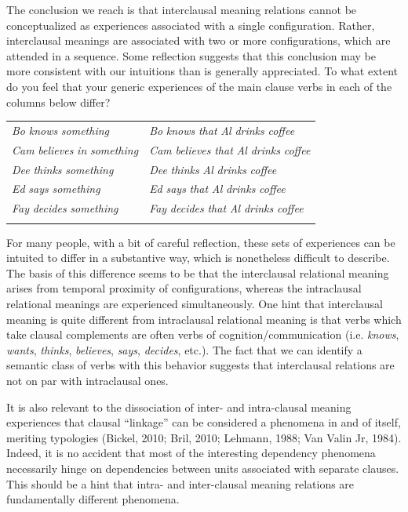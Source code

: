   The conclusion we reach is that interclausal meaning relations cannot be conceptualized as experiences associated with a single configuration. Rather, interclausal meanings are associated with two or more configurations, which are attended in a sequence. Some reflection suggests that this conclusion may be more consistent with our intuitions than is generally appreciated. To what extent do you feel that your generic experiences of the main clause verbs in each of the columns below differ?

\begin{tabularx}{\textwidth}{XX}
\lsptoprule
\textit{Bo} \textit{knows} \textit{something} & \textit{Bo} \textit{knows} \textit{that} \textit{Al} \textit{drinks} \textit{coffee}\\
\textit{Cam} \textit{believes} \textit{in} \textit{something} & \textit{Cam} \textit{believes} \textit{that} \textit{Al} \textit{drinks} \textit{coffee}\\
\textit{Dee} \textit{thinks} \textit{something}  & \textit{Dee} \textit{thinks} \textit{Al} \textit{drinks} \textit{coffee}\\
\textit{Ed} \textit{says} \textit{something} & \textit{Ed} \textit{says} \textit{that} \textit{Al} \textit{drinks} \textit{coffee}\\
\textit{Fay} \textit{decides} \textit{something} & \textit{Fay} \textit{decides} \textit{that} \textit{Al} \textit{drinks} \textit{coffee}\\
\lspbottomrule
\end{tabularx}
  For many people, with a bit of careful reflection, these sets of experiences can be intuited to differ in a substantive way, which is nonetheless difficult to describe. The basis of this difference seems to be that the interclausal relational meaning arises from temporal proximity of configurations, whereas the intraclausal relational meanings are experienced simultaneously. One hint that interclausal meaning is quite different from intraclausal relational meaning is that verbs which take clausal complements are often verbs of cognition/communication (i.e. \textit{knows}, \textit{wants}, \textit{thinks}, \textit{believes}, \textit{says}, \textit{decides}, etc.). The fact that we can identify a semantic class of verbs with this behavior suggests that interclausal relations are not on par with intraclausal ones. 

  It is also relevant to the dissociation of inter- and intra-clausal meaning experiences that clausal “linkage” can be considered a phenomena in and of itself, meriting typologies (Bickel, 2010; Bril, 2010; Lehmann, 1988; Van Valin Jr, 1984). Indeed, it is no accident that most of the interesting dependency phenomena necessarily hinge on dependencies between units associated with separate clauses. This should be a hint that intra- and inter-clausal meaning relations are fundamentally different phenomena.

